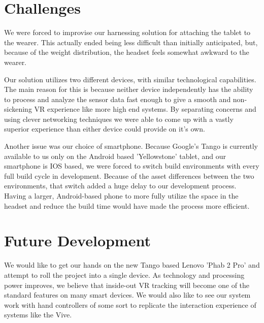 \documentclass{report}
\begin{document}
		\section*{Challenges}
		We were forced to improvise our harnessing solution for attaching the tablet to the wearer. This actually ended being less difficult than initially anticipated, but, because of the weight distribution, the headset feels somewhat awkward to the wearer.
		
		Our solution utilizes two different devices, with similar technological capabilities. The main reason for this is because neither device independently has the ability to process and analyze the sensor data fast enough to give a smooth and non-sickening VR experience like more high end systems. By separating concerns and using clever networking techniques we were able to come up with a vastly superior experience than either device could provide on it's own.
		
		Another issue was our choice of smartphone. Because Google's Tango is currently available to us only on the Android based 'Yellowstone' tablet, and our smartphone is IOS based, we were forced to switch build environments with every full build cycle in development. Because of the asset differences between the two environments, that switch added a huge delay to our development process. Having a larger, Android-based phone to more fully utilize the space in the headset and reduce the build time would have made the process more efficient.
		
		\section*{Future Development}
		We would like to get our hands on the new Tango based Lenovo 'Phab 2 Pro' and attempt to roll the project into a single device. As technology and processing power improves, we believe that inside-out VR tracking will become one of the standard features on many smart devices. We would also like to see our system work with hand controllers of some sort to replicate the interaction experience of systems like the Vive. 
\end{document}

